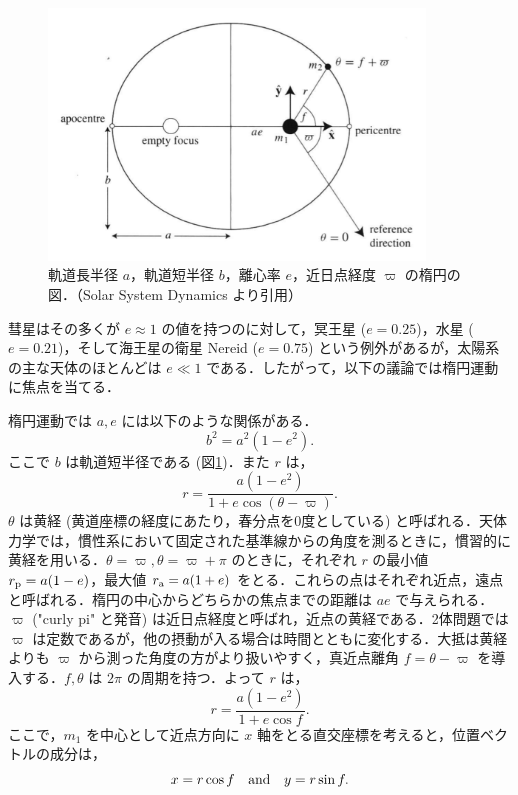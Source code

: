 \documentclass[11pt,a4paper,oneside,onecolumn]{jreport}
\begin{document}
\begin{figure}[H]
\centering
\includegraphics[width=10cm]{./image/sec2_5.pdf}
\caption{軌道長半径 $a$，軌道短半径 $b$，離心率 $e$，近日点経度 $\varpi$ の楕円の図．（Solar System Dynamics\cite{SSD} より引用）\label{fig:ellipse}}
\end{figure}

彗星はその多くが $e \approx 1$ の値を持つのに対して，冥王星 ($e = 0.25$)，水星 ($e = 0.21$)，そして海王星の衛星 Nereid ($e = 0.75$) という例外があるが，太陽系の主な天体のほとんどは $e \ll 1$ である．したがって，以下の議論では楕円運動に焦点を当てる．

楕円運動では $a, e$ には以下のような関係がある．
\begin{equation}
b^2 = a^2 (1 - e^2).
\end{equation}
ここで $b$ は軌道短半径である (図\ref{fig:ellipse})．また $r$ は，
\begin{equation}
r =\frac{a (1 - e^2)}{1+ e \cos (\theta - \varpi)}.
\end{equation}
$\theta$ は黄経 (黄道座標の経度にあたり，春分点を0度としている) と呼ばれる．天体力学では，慣性系において固定された基準線からの角度を測るときに，慣習的に黄経を用いる．$\theta = \varpi, \theta = \varpi + \pi$ のときに，それぞれ $r$ の最小値 $r_{\rm p} = a (1 - e)$，最大値 $r_{\rm a} = a (1 + e)$ をとる．これらの点はそれぞれ近点，遠点と呼ばれる．楕円の中心からどちらかの焦点までの距離は $a e$ で与えられる．$\varpi$ ("curly pi" と発音) は近日点経度と呼ばれ，近点の黄経である．2体問題では $\varpi$ は定数であるが，他の摂動が入る場合は時間とともに変化する．大抵は黄経よりも $\varpi$ から測った角度の方がより扱いやすく，真近点離角 $f = \theta - \varpi$ を導入する．$f, \theta$ は $2 \pi$ の周期を持つ．よって $r$ は，
\begin{equation}
r = \frac{a (1 - e^2)}{1+ e \cos f}. \label{eq:rf}
\end{equation}
ここで，$m_1$ を中心として近点方向に $x$ 軸をとる直交座標を考えると，位置ベクトルの成分は，
\begin{equation}
x = r \cos f \quad {\rm and} \quad y = r \sin f. \label{eq:xy}
\end{equation}
\end{document}
